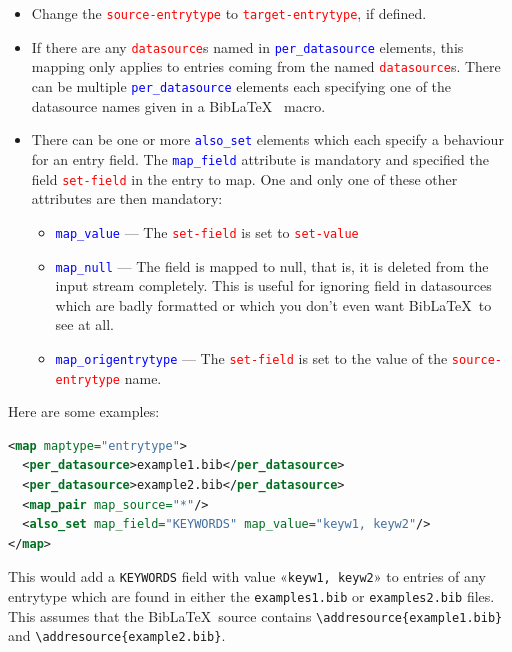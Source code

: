\documentclass{ltxdockit}
\begin{document}
\begin{itemize}
\item Change the \textcolor{red}{\texttt{source-entrytype}} to
  \textcolor{red}{\texttt{target-entrytype}}, if defined.
\item If there are any \textcolor{red}{\texttt{datasource}}s named in
  \textcolor{blue}{\texttt{per\_datasource}} elements, this mapping only applies to entries
  coming from the named \textcolor{red}{\texttt{datasource}}s. There can be
  multiple \textcolor{blue}{\texttt{per\_datasource}} elements each specifying one of the
  datasource names given in a Bib\LaTeX\ \verb++ macro.
\item There can be one or more \textcolor{blue}{\texttt{also\_set}} elements which each specify
  a behaviour for an entry field. The \textcolor{blue}{\texttt{map\_field}} attribute is
  mandatory and specified the field \textcolor{red}{\texttt{set-field}} in
  the entry to map. One and only one of these other attributes are then
  mandatory:
  \begin{itemize}
    \item \textcolor{blue}{\texttt{map\_value}} --- The
      \textcolor{red}{\texttt{set-field}} is set to
      \textcolor{red}{\texttt{set-value}}
    \item \textcolor{blue}{\texttt{map\_null}} --- The field is mapped to
      null, that is, it is deleted from the input stream completely. This
      is useful for ignoring field in datasources which are badly formatted
      or which you don't even want Bib\LaTeX\ to see at all.
      \item \textcolor{blue}{\texttt{map\_origentrytype}} --- The
        \textcolor{red}{\texttt{set-field}} is set to the value of the
        \linebreak\textcolor{red}{\texttt{source-entrytype}} name.
  \end{itemize}
\end{itemize}

\noindent Here are some examples:

\begin{lstlisting}[language=xml,escapechar=+,mathescape=true]
<map maptype="entrytype">
  <per_datasource>example1.bib</per_datasource>
  <per_datasource>example2.bib</per_datasource>
  <map_pair map_source="*"/>
  <also_set map_field="KEYWORDS" map_value="keyw1, keyw2"/>
</map>
\end{lstlisting}

\noindent This would add a \verb+KEYWORDS+ field with value «\verb+keyw1, keyw2+»
to entries of any entrytype which are found in either the
\verb+examples1.bib+ or \verb+examples2.bib+ files. This assumes that the
Bib\LaTeX\ source contains \verb+\addresource{example1.bib}+ and
\verb+\addresource{example2.bib}+.
\end{document}
